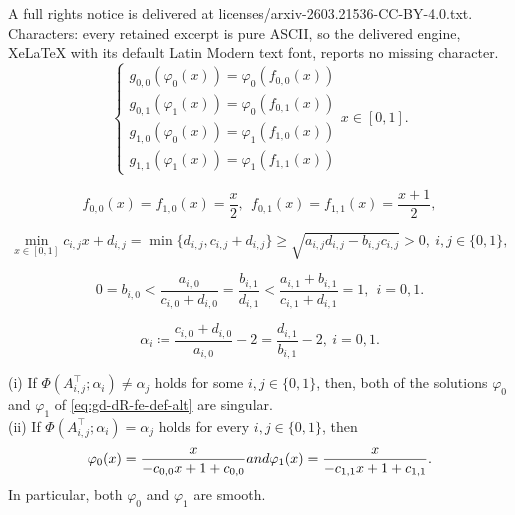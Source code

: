 \documentclass[10pt,a4paper]{amsart}
\begin{document}
A full rights notice is delivered at licenses/arxiv-2603.21536-CC-BY-4.0.txt. Characters: every retained excerpt is pure ASCII, so the delivered engine, XeLaTeX with its default Latin Modern text font, reports no missing character.
\begin{equation}\label{eq:gd-dR-fe-def-alt} 
\begin{cases} g_{0,0}(\varphi_{0}(x)) = \varphi_0 (f_{0,0}(x))  \\ g_{0,1}(\varphi_{1}(x)) = \varphi_0 (f_{0,1}(x))  \\ g_{1,0}(\varphi_{0}(x)) = \varphi_1 (f_{1,0}(x))  \\ g_{1,1}(\varphi_{1}(x)) = \varphi_1 (f_{1,1}(x))  \end{cases}   x \in [0,1]. 
\end{equation}

\begin{equation}\label{eq:def-f-dyadic} 
f_{0,0}(x) = f_{1,0}(x) = \frac{x}{2}, \ \ f_{0,1}(x) = f_{1,1}(x) = \frac{x+1}{2}, 
\end{equation}

\begin{equation}\label{eq:cd-posi} 
\min_{x \in [0,1]} c_{i,j} x + d_{i,j} = \min\{d_{i,j}, c_{i,j} + d_{i,j}\} \ge \sqrt{a_{i,j} d_{i,j} - b_{i,j} c_{i,j}} > 0, \ i, j \in \{0,1\}, 
\end{equation} 

\begin{equation}\label{eq:compatible-LF} 
0 = b_{i,0} < \dfrac{a_{i,0}}{c_{i,0} + d_{i,0}} = \dfrac{b_{i,1}}{d_{i,1}} < \frac{a_{i,1} + b_{i,1}}{c_{i,1} + d_{i,1}} = 1, \ \ i = 0,1.
\end{equation}  

\begin{equation}\label{eq:def-alpha} 
\alpha_i \coloneqq \frac{c_{i,0} + d_{i,0}}{a_{i,0}} - 2 = \frac{d_{i,1}}{b_{i,1}} - 2, \ i = 0,1. 
\end{equation} 

\begin{Thm}\label{thm:LF}
(i) If $\Phi \left(A_{i,j}^{\top}; \alpha_i \right) \ne \alpha_j$ holds for some $i, j \in \{0,1\}$, 
then, both of the solutions $\varphi_0$ and $\varphi_1$ of  \eqref{eq:gd-dR-fe-def-alt} are singular.\\
(ii) If $\Phi \left(A_{i,j}^{\top}; \alpha_i \right) = \alpha_j$ holds for every $i, j \in \{0,1\}$, 
then 
\begin{equation}\label{eq:solution-ac} 
\varphi_0 (x) = \frac{x}{-c_{0,0} x + 1 + c_{0,0}} \textup{ and } \varphi_1 (x) = \frac{x}{-c_{1,1} x + 1 + c_{1,1}}. 
\end{equation}
In particular, both $\varphi_0$ and $\varphi_1$ are smooth. 
\end{Thm}
\end{document}
